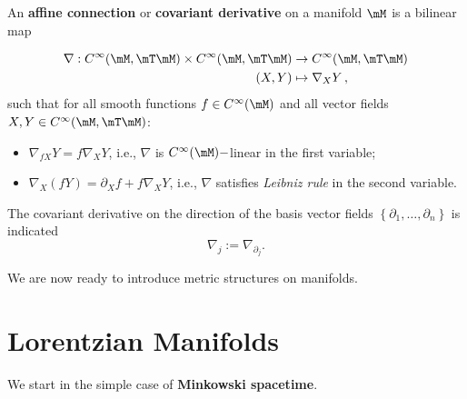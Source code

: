 \begin{definition}
	An \textbf{affine connection} or \textbf{covariant derivative} on a manifold $\mM$ is a bilinear map
	
	\[\begin{split}
	\nabla: C^\infty(\mM,\mT\mM)\times C^\infty(\mM,\mT\mM) & \rightarrow C^\infty(\mM,\mT\mM)\\
	(X,Y) & \mapsto \nabla_X Y\,,
	\end{split} \]
	such that for all smooth functions $f\in C^\infty(\mM)$ and all vector fields $X,Y\in C^\infty(\mM,\mT\mM)$:
	\begin{itemize}
		\item 	$\nabla_{fX}Y= f\nabla_X Y$, i.e., $\nabla$ is $C^\infty(\mM)-$linear in the first variable;
		\item $\nabla_X (fY) = \partial_X f+ f\nabla_X Y$, i.e., $\nabla$ satisfies \emph{Leibniz rule} in the second variable.
	\end{itemize}
\label{defn:connection}
\end{definition}

The covariant derivative on the direction of the basis vector fields $\left\{\partial_1,\dots,\partial_n\right\}$ is indicated
\[	\nabla_{j}:=\nabla_{\partial_j}.	\]



We are now ready to introduce metric structures on manifolds.

\section{Lorentzian Manifolds}

We start in the simple case of \textbf{Minkowski spacetime}.


